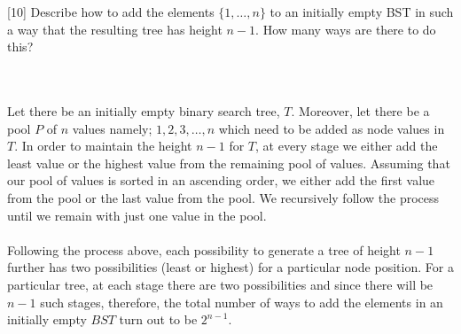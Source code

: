 \documentclass[addpoints]{exam}
\begin{document}
\begin{questions}
  [10]
  Describe how to add the elements $\{1,\ldots,n\}$ to an initially empty BST in such a way that the resulting tree has height $n-1$. How many ways are there to do this?
  \begin{solution}\\ \\
  	Let there be an initially empty binary search tree, $T$. Moreover, let there be a pool $P$ of $n$ values namely; $1, 2, 3, \ldots, n$ which need to be added as node values in $T$. In order to maintain the height $n-1$ for $T$, at every stage we either add the least value or the highest value from the remaining pool of values. Assuming that our pool of values is sorted in an ascending order, we either add the first value from the pool or the last value from the pool. We recursively follow the process until we remain with just one value in the pool. \\ \\
  	Following the process above, each possibility to generate a tree of height $n-1$ further has two possibilities (least or highest) for a particular node position. For a particular tree, at each stage there are two possibilities and since there will be $n-1$ such stages, therefore, the total number of ways to add the elements in an initially empty $BST$ turn out to be $2^{n-1}$.
  \end{solution}
\pagebreak


\end{questions}
\end{document}
